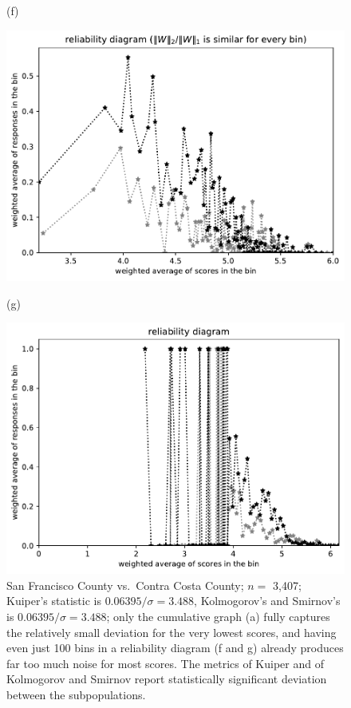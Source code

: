 \documentclass{article}
\newlength{\imsize}
\begin{document}
\begin{figure}
\begin{centering}
(f)
\parbox{\imsize}{\includegraphics[width=\imsize]
{../codes/weighted/County_of_San_Francisco_vs_Contra_Costa-LNGI/equierrs100.pdf}}
\quad\quad
(g)
\parbox{\imsize}{\includegraphics[width=\imsize]
{../codes/weighted/County_of_San_Francisco_vs_Contra_Costa-LNGI/equiscores100.pdf}}

\end{centering}
\caption{San Francisco County vs.\ Contra Costa County; $n =$ 3,407;
         Kuiper's statistic is $0.06395 / \sigma = 3.488$,
         Kolmogorov's and Smirnov's is $0.06395 / \sigma = 3.488$;
         only the cumulative graph (a) fully captures the relatively small
         deviation for the very lowest scores, and having even just 100 bins
         in a reliability diagram (f and g) already produces far too much noise
         for most scores.
         The metrics of Kuiper and of Kolmogorov and Smirnov report
         statistically significant deviation between the subpopulations.
}
\label{San_Francisco-Contra_Costa}
\end{figure}
\end{document}

